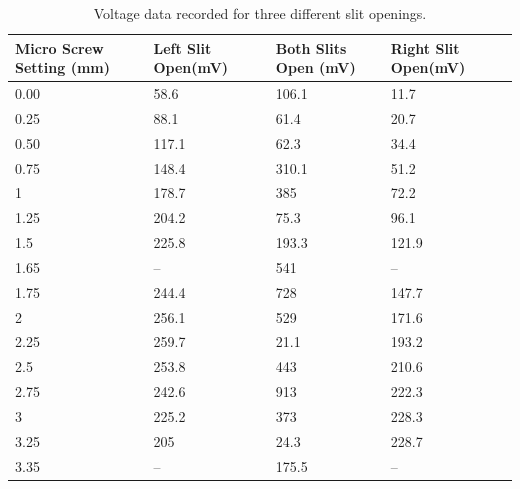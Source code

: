 \documentclass[12pt letterpaper]{article}
\begin{document}
\begin{table}[!htb]
\centering
\caption{Voltage data recorded for three different slit openings. }
\label{voltage_table}
\begin{tabular}{|l|l|l|l|}
\hline
Micro Screw Setting (mm) & Left Slit Open(mV) & Both Slits Open (mV) & Right Slit Open(mV) \\ \hline
0.00                    & 58.6               & 106.1                & 11.7                \\ \hline
0.25                    & 88.1               & 61.4                 & 20.7                \\ \hline
0.50                    & 117.1              & 62.3                 & 34.4                \\ \hline
0.75                    & 148.4              & 310.1                & 51.2                \\ \hline
1                       & 178.7              & 385                  & 72.2                \\ \hline
1.25                    & 204.2              & 75.3                 & 96.1                \\ \hline
1.5                     & 225.8              & 193.3                & 121.9               \\ \hline
1.65                    & --                 & 541                  & --                  \\ \hline
1.75                    & 244.4              & 728                  & 147.7               \\ \hline
2                       & 256.1              & 529                  & 171.6               \\ \hline
2.25                    & 259.7              & 21.1                 & 193.2               \\ \hline
2.5                     & 253.8              & 443                  & 210.6               \\ \hline
2.75                    & 242.6              & 913                  & 222.3               \\ \hline
3                       & 225.2              & 373                  & 228.3               \\ \hline
3.25                    & 205                & 24.3                 & 228.7               \\ \hline
3.35                    & --                 & 175.5                & --                  \\ \hline

\end{tabular}
\end{table}
\end{document}
